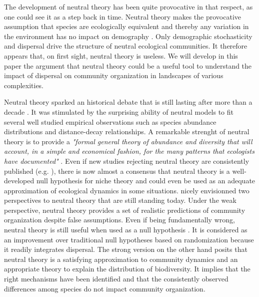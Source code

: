 \documentclass[12pt]{article}
\begin{document}
The development of neutral theory has been quite provocative in that
respect, as one could see it as a step back in time. Neutral theory makes the
provocative assumption that species are ecologically equivalent and thereby any
variation in the environment has no impact on demography
\parencite{Bell2000,Hubbell2001}. Only demographic stochasticity and dispersal
drive the structure of neutral ecological communities. It therefore appears
that, on first sight, neutral theory is useless.  We will develop in this paper
the argument that neutral theory could be a useful tool to understand the impact
of dispersal on community organization in landscapes of various complexities. 

Neutral theory sparked an historical debate that is still
lasting after more than a decade \parencite{Chave2004, Etiennee2011,
Rosindell2012,Clark2012}. It was stimulated by the surprising ability of neutral
models to fit several well studied empirical observations such as species
abundance distributions and distance-decay relationships. A remarkable strenght
of neutral theory is to provide a \emph{"formal general theory of abundance
and diversity that will account, in a simple and economical fashion, for the
many patterns that ecologists have documented"} \parencite{Bell2001}. Even if
new studies rejecting neutral theory are consistently published (e.g.
\textcite{Ricklefs2012}), there is now almost a consensus that neutral theory is
a well-developed null hypothesis for niche theory and could even be used as an
adequate approximation of ecological dynamics in some situations.
\textcite{Bell2001} nicely envisionned two perspectives to neutral theory that
are still standing today. Under the weak perspective, neutral theory provides a
set of realistic predictions of community organization despite false
assumptions. Even if being fundamentally wrong, neutral theory is still useful
when used as a null hypothesis \parencite{Gotelli2006}. It is considered as an
improvement over traditional null hypotheses based on randomization
\parencite{Gotelli2000} because it readily integrates dispersal. The strong
version on the other hand posits that neutral theory is a satisfying
approximation to community dynamics and an appropriate theory to explain the
distribution of biodiversity. It implies that the right mechanisms have been
identified and that the consistently observed differences among species do not
impact community organization. 
\end{document}
